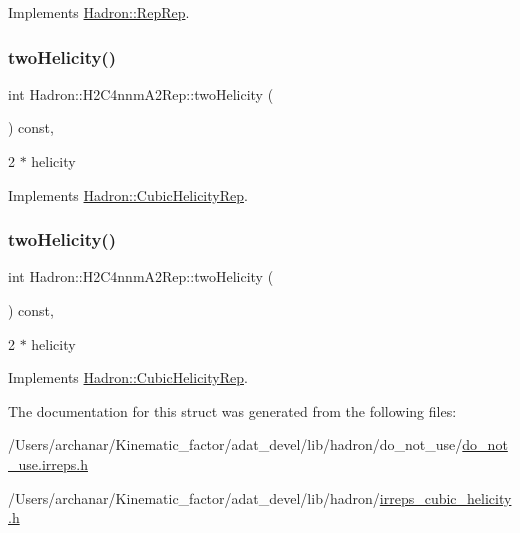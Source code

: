 Implements \mbox{\hyperlink{structHadron_1_1RepRep_ab3213025f6de249f7095892109575fde}{Hadron\+::\+Rep\+Rep}}.

\mbox{\label{structHadron_1_1H2C4nnmA2Rep_ad9e40b53e19e1adae3441a6a6320d3b1}} 
\subsubsection{\texorpdfstring{twoHelicity()}{twoHelicity()}\hspace{0.1cm}{\footnotesize\ttfamily [1/2]}}
{\footnotesize\ttfamily int Hadron\+::\+H2\+C4nnm\+A2\+Rep\+::two\+Helicity (\begin{DoxyParamCaption}{ }\end{DoxyParamCaption}) const\hspace{0.3cm}{\ttfamily [inline]}, {\ttfamily [virtual]}}

2 $\ast$ helicity 

Implements \mbox{\hyperlink{structHadron_1_1CubicHelicityRep_af507aa56fc2747eacc8cb6c96db31ecc}{Hadron\+::\+Cubic\+Helicity\+Rep}}.

\mbox{\label{structHadron_1_1H2C4nnmA2Rep_ad9e40b53e19e1adae3441a6a6320d3b1}} 
\subsubsection{\texorpdfstring{twoHelicity()}{twoHelicity()}\hspace{0.1cm}{\footnotesize\ttfamily [2/2]}}
{\footnotesize\ttfamily int Hadron\+::\+H2\+C4nnm\+A2\+Rep\+::two\+Helicity (\begin{DoxyParamCaption}{ }\end{DoxyParamCaption}) const\hspace{0.3cm}{\ttfamily [inline]}, {\ttfamily [virtual]}}

2 $\ast$ helicity 

Implements \mbox{\hyperlink{structHadron_1_1CubicHelicityRep_af507aa56fc2747eacc8cb6c96db31ecc}{Hadron\+::\+Cubic\+Helicity\+Rep}}.



The documentation for this struct was generated from the following files\+:\begin{DoxyCompactItemize}
\item 
/\+Users/archanar/\+Kinematic\+\_\+factor/adat\+\_\+devel/lib/hadron/do\+\_\+not\+\_\+use/\mbox{\hyperlink{do__not__use_8irreps_8h}{do\+\_\+not\+\_\+use.\+irreps.\+h}}\item 
/\+Users/archanar/\+Kinematic\+\_\+factor/adat\+\_\+devel/lib/hadron/\mbox{\hyperlink{lib_2hadron_2irreps__cubic__helicity_8h}{irreps\+\_\+cubic\+\_\+helicity.\+h}}\end{DoxyCompactItemize}

